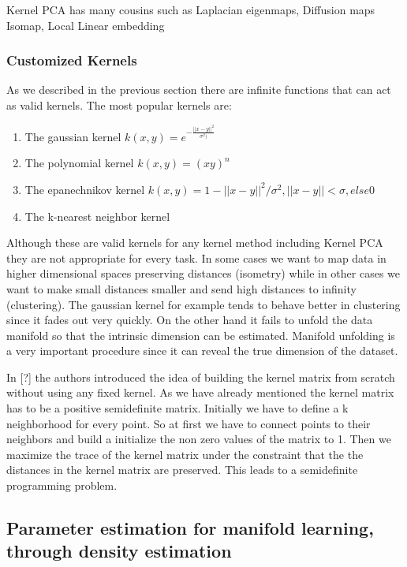 \documentclass[12pt,letterpaper,doublespaced,ETD,dvips,proposal]{gtthesis}
\begin{document}
\begin{Body}
Kernel PCA has many cousins such as Laplacian eigenmaps, Diffusion
maps Isomap, Local Linear embedding

\subsubsection{Customized Kernels}
As we described in the previous section there are infinite functions
that can act as valid kernels. The most popular kernels are:
\begin{enumerate}
  \item The gaussian kernel $k(x, y)=e^{-\frac{||x-y||^2}{\sigma^2)}}$
  \item The polynomial kernel $k(x, y)=(xy)^n$
  \item The epanechnikov kernel $k(x, y)=1-||x-y||^2/\sigma^2, ||x-y||<\sigma, else 0$
  \item The k-nearest neighbor kernel
\end{enumerate}

Although these are valid kernels for any kernel method including
Kernel PCA they are not appropriate for every task. In some cases we
want to map data in higher dimensional spaces preserving distances
(isometry) while in other cases we want to make small distances
smaller and send high distances to infinity (clustering). The
gaussian kernel for example tends to behave better in clustering
since it fades out very quickly. On the other hand it fails to
unfold the data manifold so that the intrinsic dimension can be
estimated. Manifold unfolding is a very important procedure since it
can reveal the true dimension of the dataset.

In [?] the authors introduced the idea of building the kernel matrix
from scratch without using any fixed kernel. As we have already
mentioned the kernel matrix has to be a positive semidefinite
matrix. Initially we have to define a k neighborhood  for every
point. So at first we have to connect points to their neighbors and
build a initialize the non zero values of the matrix to 1. Then we
maximize the trace of the kernel matrix under the constraint that
the the distances in the kernel matrix are preserved. This leads to
a semidefinite programming problem.



\subsection{Parameter estimation for manifold learning, through density estimation}


\end{Body}
\end{document}
